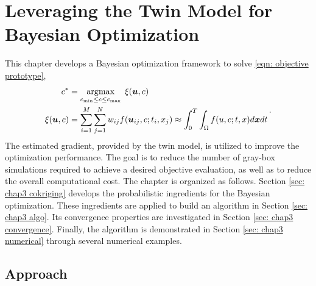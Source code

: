 \chapter{Leveraging the Twin Model for Bayesian Optimization}
\label{chapter 3}
This chapter develops a Bayesian optimization framework to solve \eqref{eqn: objective prototype},
\begin{equation*}\begin{split}
    c^* &= \argmax_{c_{\min}\le  c \le c_{\max}}\; \xi(\boldsymbol{u},c) \\
    \xi(\boldsymbol{u},c) &= \sum_{i=1}^M \sum_{j=1}^N w_{ij} f(\boldsymbol{u}_{ij},c; t_i,x_j)
    \approx \int_0^T \int_\Omega f(u,c; t,x)d\boldsymbol{x} d t%
    \label{eqn: objective prototype}
\end{split}\,.\end{equation*}
The estimated gradient, provided by the twin model, is utilized 
to improve the optimization performance. The goal is to reduce the number of gray-box 
simulations required to achieve a desired objective evaluation, as well as
to reduce the overall computational cost. The chapter is organized as follows.
Section \ref{sec: chap3 cokriging} develops the probabilistic ingredients for the
Bayesian optimization. These ingredients are applied to build an algorithm
in Section \ref{sec: chap3 algo}. Its convergence properties are
investigated in Section \ref{sec: chap3 convergence}. Finally, the algorithm is demonstrated 
in Section \ref{sec: chap3 numerical} through several numerical examples.\\

\section{Approach}
\label{sec: chap3 approach}

